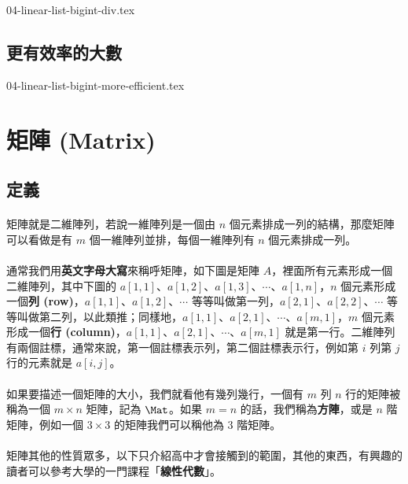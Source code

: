 \documentclass[12pt,a4paper,oneside]{report}
\begin{document}
\begin{CJK}{UTF8}{bkai}
{04-linear-list-bigint-div.tex}

\subsection{更有效率的大數}

{04-linear-list-bigint-more-efficient.tex}

\section{矩陣 (Matrix)}
\subsection{定義}

\paragraph{}矩陣就是二維陣列，若說一維陣列是一個由 $n$ 個元素排成一列的結構，那麼矩陣可以看做是有 $m$ 個一維陣列並排，每個一維陣列有 $n$ 個元素排成一列。
\paragraph{}通常我們用\textbf{英文字母大寫}來稱呼矩陣，如下圖是矩陣 $A$，裡面所有元素形成一個二維陣列，其中下圖的 $a[1,1]$、$a[1,2]$、$a[1,3]$、$\cdots$、$a[1,n]$，$n$ 個元素形成一個\textbf{列 (row)}，$a[1,1]$、$a[1,2]$、$\cdots$ 等等叫做第一列，$a[2,1]$、$a[2,2]$、$\cdots$ 等等叫做第二列，以此類推；同樣地，$a[1,1]$、$a[2,1]$、$\cdots$、$a[m,1]$，$m$ 個元素形成一個\textbf{行 (column)}，$a[1,1]$、$a[2,1]$、$\cdots$、$a[m,1]$ 就是第一行。二維陣列有兩個註標，通常來說，第一個註標表示列，第二個註標表示行，例如第 $i$ 列第 $j$ 行的元素就是 $a[i,j]$。

\paragraph{}如果要描述一個矩陣的大小，我們就看他有幾列幾行，一個有 $m$ 列 $n$ 行的矩陣被稱為一個 $m\times{n}$ 矩陣，記為 \textbf{$\Mat$}。如果 $m=n$ 的話，我們稱為\textbf{方陣}，或是 $n$ 階矩陣，例如一個 $3\times{3}$ 的矩陣我們可以稱他為 $3$ 階矩陣。

\paragraph{}矩陣其他的性質眾多，以下只介紹高中才會接觸到的範圍，其他的東西，有興趣的讀者可以參考大學的一門課程「\textbf{線性代數}」。


\end{CJK}
\end{document}
